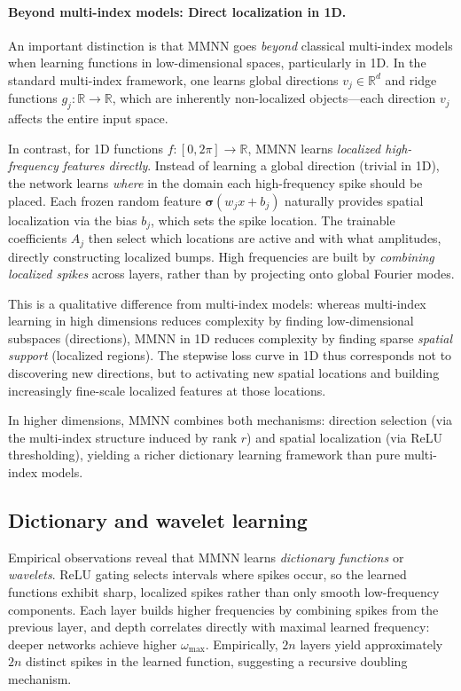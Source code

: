 \documentclass{article}
\DeclareRobustCommand{\ReLU}{\mathrel{\boldsymbol{\sigma}}}
\begin{document}
\paragraph{Beyond multi-index models: Direct localization in 1D.}
An important distinction is that MMNN goes \emph{beyond} classical multi-index models when learning functions in low-dimensional spaces, particularly in 1D. In the standard multi-index framework, one learns global directions \( v_j \in \mathbb{R}^d \) and ridge functions \( g_j : \mathbb{R} \to \mathbb{R} \), which are inherently non-localized objects—each direction \( v_j \) affects the entire input space.

In contrast, for 1D functions \( f : [0, 2\pi] \to \mathbb{R} \), MMNN learns \emph{localized high-frequency features directly}. Instead of learning a global direction (trivial in 1D), the network learns \emph{where} in the domain each high-frequency spike should be placed. Each frozen random feature \( \ReLU(w_j x + b_j) \) naturally provides spatial localization via the bias \( b_j \), which sets the spike location. The trainable coefficients \( A_j \) then select which locations are active and with what amplitudes, directly constructing localized bumps. High frequencies are built by \emph{combining localized spikes} across layers, rather than by projecting onto global Fourier modes.

This is a qualitative difference from multi-index models: whereas multi-index learning in high dimensions reduces complexity by finding low-dimensional subspaces (directions), MMNN in 1D reduces complexity by finding sparse \emph{spatial support} (localized regions). The stepwise loss curve in 1D thus corresponds not to discovering new directions, but to activating new spatial locations and building increasingly fine-scale localized features at those locations.

In higher dimensions, MMNN combines both mechanisms: direction selection (via the multi-index structure induced by rank \( r \)) and spatial localization (via ReLU thresholding), yielding a richer dictionary learning framework than pure multi-index models.

\vspace{1em}
\subsection{Dictionary and wavelet learning}
Empirical observations reveal that MMNN learns \emph{dictionary functions} or \emph{wavelets}. ReLU gating selects intervals where spikes occur, so the learned functions exhibit sharp, localized spikes rather than only smooth low-frequency components. Each layer builds higher frequencies by combining spikes from the previous layer, and depth correlates directly with maximal learned frequency: deeper networks achieve higher \( \omega_{\max} \). Empirically, \( 2n \) layers yield approximately \( 2n \) distinct spikes in the learned function, suggesting a recursive doubling mechanism.
\end{document}
